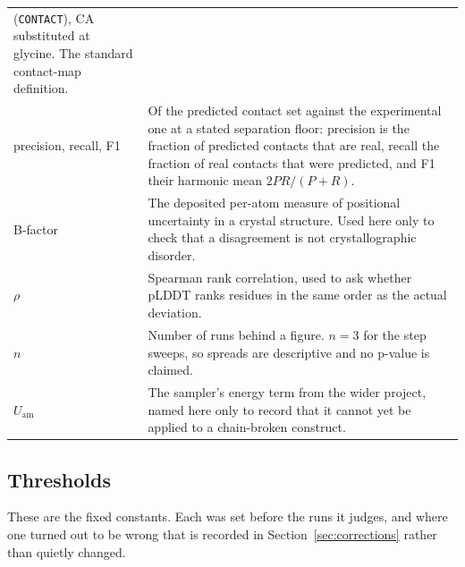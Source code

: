 \documentclass[11pt,a4paper]{article}
\newcommand{\plddt}{pLDDT}
\begin{document}
\begin{center}
\begin{tabular}{@{}lp{11.4cm}@{}}
  (\texttt{CONTACT}), CA substituted at glycine. The standard contact-map
  definition. \\
precision, recall, F1 & Of the predicted contact set against the experimental
  one at a stated separation floor: precision is the fraction of predicted
  contacts that are real, recall the fraction of real contacts that were
  predicted, and F1 their harmonic mean $2PR/(P+R)$. \\
B-factor & The deposited per-atom measure of positional uncertainty in a
  crystal structure. Used here only to check that a disagreement is not
  crystallographic disorder. \\
$\rho$ & Spearman rank correlation, used to ask whether \plddt{} ranks
  residues in the same order as the actual deviation. \\
$n$ & Number of runs behind a figure. $n=3$ for the step sweeps, so spreads are
  descriptive and no p-value is claimed. \\
$U_{\mathrm{am}}$ & The sampler's energy term from the wider project, named here
  only to record that it cannot yet be applied to a chain-broken construct. \\
\bottomrule
\end{tabular}
\end{center}

\subsection{Thresholds}

These are the fixed constants. Each was set before the runs it judges, and
where one turned out to be wrong that is recorded in
Section~\ref{sec:corrections} rather than quietly changed.
\end{document}
